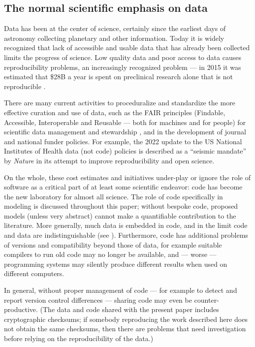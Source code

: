 \begin{change}
\subsection{The normal scientific emphasis on data}
Data has been at the center of science, certainly since the earliest days of astronomy collecting planetary and other information. Today it is widely recognized that lack of accessible and usable data that has already been collected limits the progress of science. Low quality data and poor access to data causes reproducibility problems, an increasingly recognized problem --- in 2015 it was estimated that \$28B a year is spent on preclinical research alone that is not reproducible \cite{preclinical-reproducibility}.

There are many current activities to proceduralize and standardize the more effective curation and use of data, such as the FAIR principles (Findable, Accessible, Interoperable and Reusable --- both for machines and for people) for scientific data management and stewardship \cite{fair}, and in the development of journal and national funder policies. For example, the 2022 update to the US National Institutes of Health data (not code) policies \cite{nih-policy} is described as a ``seismic mandate'' by \emph{Nature\/} \cite{nih-nature} in its attempt to improve reproducibility and open science.

On the whole, these cost estimates and initiatives under-play or ignore the role of software as a critical part of at least some scientific endeavor: code has become the new laboratory for almost all science. The role of code specifically in modeling is discussed throughout this paper; without bespoke code, proposed models (unless very abstract) cannot make a quantifiable contribution to the literature. More generally, much data is embedded in code, and in the limit code and data are indistinguishable (see \supplement). Furthermore, code has additional problems of versions and compatibility beyond those of data, for example suitable compilers to run old code may no longer be available, and --- worse --- programming systems may silently produce different results when used on different computers. 

In general, without proper management of code --- for example to detect and report version control differences --- sharing code may even be counter-productive. (The data and code shared with the present paper includes cryptographic checksums; if somebody reproducing the work described here does not obtain the same checksums, then there are problems that need investigation before relying on the reproducibility of the data.)


\end{change}
